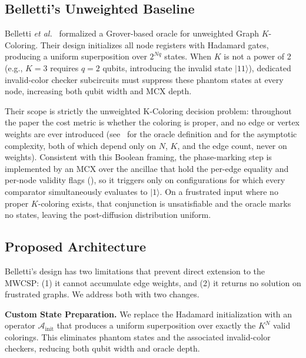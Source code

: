 \documentclass{ieeeaccess}
\begin{document}
\subsection{Belletti's Unweighted Baseline}

Belletti \textit{et al.}~\cite{belletti2025} formalized a
Grover-based oracle for unweighted Graph $K$-Coloring. Their design
initializes all node registers with Hadamard gates, producing a
uniform superposition over $2^{Nq}$ states. When $K$ is not a power
of 2 (e.g., $K=3$ requires $q=2$ qubits, introducing the invalid
state $|11\rangle$), dedicated invalid-color checker subcircuits must
suppress these phantom states at every node, increasing both qubit
width and MCX depth.

Their scope is strictly the unweighted K-Coloring decision
problem: throughout the paper the cost metric is whether the
coloring is proper, and no edge or vertex weights are ever
introduced (see~\cite[Sec.~III]{belletti2025} for the oracle
definition and \cite[Table~I]{belletti2025} for the asymptotic
complexity, both of which depend only on $N$, $K$, and the edge
count, never on weights). Consistent with this Boolean framing,
the phase-marking step is implemented by an MCX over the ancillae
that hold the per-edge equality and per-node validity flags
(\cite[Sec.~III.C]{belletti2025}), so it triggers only on
configurations for which every comparator simultaneously evaluates
to $|1\rangle$. On a frustrated input where no proper $K$-coloring
exists, that conjunction is unsatisfiable and the oracle marks
no states, leaving the post-diffusion distribution uniform.

\subsection{Proposed Architecture}

Belletti's design has two limitations that prevent direct extension to
the MWCSP: (1) it cannot accumulate edge weights, and (2) it returns
no solution on frustrated graphs. We address both with two changes.

\textbf{Custom State Preparation.} We replace the Hadamard
initialization with an operator $\mathcal{A}_\mathrm{init}$ that
produces a uniform superposition over exactly the $K^N$ valid
colorings. This eliminates phantom states and the associated
invalid-color checkers, reducing both qubit width and oracle depth.
\end{document}
